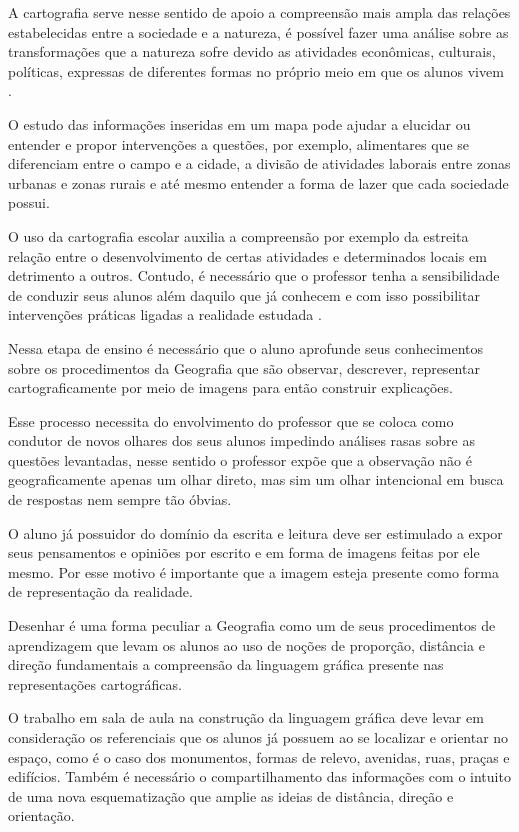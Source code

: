 \begin{refsection}
    A cartografia serve nesse sentido de apoio a compreensão mais ampla das relações estabelecidas entre a sociedade e a natureza, é possível fazer uma análise sobre as transformações que a natureza sofre devido as atividades econômicas, culturais, políticas, expressas de diferentes formas no próprio meio em que os alunos vivem \cite{ALMEIDA2011Novos}.  

    O estudo das informações inseridas em um mapa pode ajudar a elucidar ou entender e propor intervenções a questões, por exemplo, alimentares que se diferenciam entre o campo e a cidade, a divisão de atividades laborais entre zonas urbanas e zonas rurais e até mesmo entender a forma de lazer que cada sociedade possui. 

    O uso da cartografia escolar auxilia a compreensão por exemplo da estreita relação entre o desenvolvimento de certas atividades e determinados locais em detrimento a outros. Contudo, é necessário que o professor tenha a sensibilidade de conduzir seus alunos além daquilo que já conhecem e com isso possibilitar intervenções práticas ligadas a realidade estudada \cite{ALMEIDA2011Novos}. 

    Nessa etapa de ensino é necessário que o aluno aprofunde seus conhecimentos sobre os procedimentos da Geografia que são observar, descrever, representar cartograficamente por meio de imagens para então construir explicações.  

    Esse processo necessita do envolvimento do professor que se coloca como condutor de novos olhares dos seus alunos impedindo análises rasas sobre as questões levantadas, nesse sentido o professor expõe que a observação não é geograficamente apenas um olhar direto, mas sim um olhar intencional em busca de respostas nem sempre tão óbvias. 

    O aluno já possuidor do domínio da escrita e leitura deve ser estimulado a expor seus pensamentos e opiniões por escrito e em forma de imagens feitas por ele mesmo. Por esse motivo é importante que a imagem esteja presente como forma de representação da realidade.  

    Desenhar é uma forma peculiar a Geografia como um de seus procedimentos de aprendizagem que levam os alunos ao uso de noções de proporção, distância e direção fundamentais a compreensão da linguagem gráfica presente nas representações cartográficas.  

    O trabalho em sala de aula na construção da linguagem gráfica deve levar em consideração os referenciais que os alunos já possuem ao se localizar e orientar no espaço, como é o caso dos monumentos, formas de relevo, avenidas, ruas, praças e edifícios. Também é necessário o compartilhamento das informações com o intuito de uma nova esquematização que amplie as ideias de distância, direção e orientação.  


\end{refsection}
